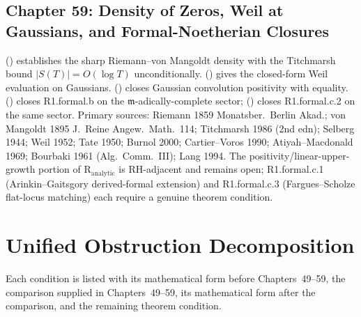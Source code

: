 \subsection{Chapter 59: Density of Zeros, Weil at Gaussians, and Formal-Noetherian Closures}
\label{v4-arith:w5-synth:ch59}

 (\ClaimStatusProvedHere) establishes
the sharp Riemann--von Mangoldt density with the Titchmarsh bound
\(|S(T)|=O(\log T)\) unconditionally.
 (\ClaimStatusProvedHere)
gives the closed-form Weil evaluation on Gaussians.
 (\ClaimStatusProvedHere) closes
Gaussian convolution positivity with equality.
 (\ClaimStatusProvedHere)
closes R1.formal.b on the \(\mathfrak{m}\)-adically-complete sector;
 (\ClaimStatusProvedHere) closes
R1.formal.c.2 on the same sector.
Primary sources: Riemann 1859 Monatsber.~Berlin Akad.;
von Mangoldt 1895 J.~Reine Angew.~Math.~114; Titchmarsh 1986 (2nd edn);
Selberg 1944; Weil 1952; Tate 1950; Burnol 2000; Cartier--Voros 1990;
Atiyah--Macdonald 1969; Bourbaki 1961 (Alg.~Comm.~III); Lang 1994.
The positivity/linear-upper-growth portion of
\(\mathrm{R}_{\mathrm{analytic}}\) is RH-adjacent and remains open;
R1.formal.c.1 (Arinkin--Gaitsgory derived-formal extension) and
R1.formal.c.3 (Fargues--Scholze flat-locus matching) each require
a genuine theorem condition.

\section{Unified Obstruction Decomposition}
\label{v4-arith:w5-synth:unified-table}

Each condition is listed with its mathematical form before
Chapters~49--59, the comparison supplied in Chapters~49--59, its
mathematical form after the comparison, and the remaining theorem
condition.

